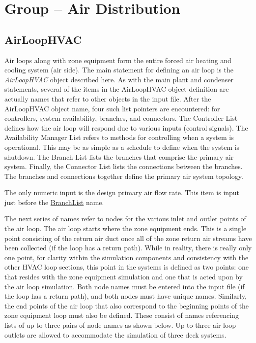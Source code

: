 \section{Group -- Air Distribution}\label{group-air-distribution}

\subsection{AirLoopHVAC}\label{airloophvac}

Air loops along with zone equipment form the entire forced air heating and cooling system (air side). The main statement for defining an air loop is the \emph{AirLoopHVAC} object described here. As with the main plant and condenser statements, several of the items in the AirLoopHVAC object definition are actually names that refer to other objects in the input file. After the AirLoopHVAC object name, four such list pointers are encountered: for controllers, system availability, branches, and connectors. The Controller List defines how the air loop will respond due to various inputs (control signals). The Availability Manager List refers to methods for controlling when a system is operational. This may be as simple as a schedule to define when the system is shutdown. The Branch List lists the branches that comprise the primary air system. Finally, the Connector List lists the connections between the branches. The branches and connections together define the primary air system topology.

The only numeric input is the design primary air flow rate. This item is input just before the \hyperref[branchlist]{BranchList} name.

The next series of names refer to nodes for the various inlet and outlet points of the air loop. The air loop starts where the zone equipment ends. This is a single point consisting of the return air duct once all of the zone return air streams have been collected (if the loop has a return path). While in reality, there is really only one point, for clarity within the simulation components and consistency with the other HVAC loop sections, this point in the systems is defined as two points: one that resides with the zone equipment simulation and one that is acted upon by the air loop simulation. Both node names must be entered into the input file (if the loop has a return path), and both nodes must have unique names. Similarly, the end points of the air loop that also correspond to the beginning points of the zone equipment loop must also be defined. These consist of names referencing lists of up to three pairs of node names as shown below. Up to three air loop outlets are allowed to accommodate the simulation of three deck systems.

